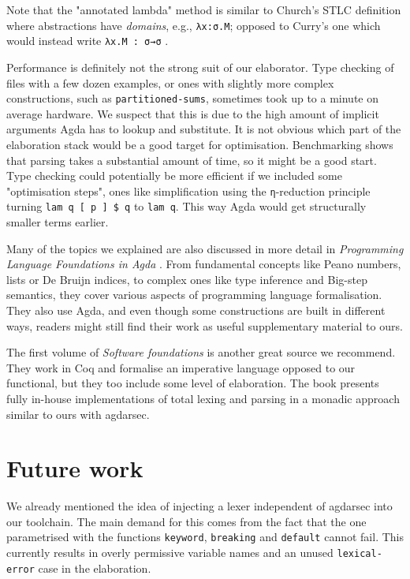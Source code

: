Note that the "annotated lambda" method is similar to Church's STLC definition where abstractions have \textit{domains}, e.g., \verb$λx:σ.M$; opposed to Curry's one which would instead write \verb$λx.M : σ→σ$ \cite{sorensen1998curry}.

Performance is definitely not the strong suit of our elaborator. Type checking of files with a few dozen examples, or ones with slightly more complex constructions, such as \verb$partitioned-sums$, sometimes took up to a minute on average hardware. We suspect that this is due to the high amount of implicit arguments Agda has to lookup and substitute. It is not obvious which part of the elaboration stack would be a good target for optimisation. Benchmarking shows that parsing takes a substantial amount of time, so it might be a good start. Type checking could potentially be more efficient if we included some "optimisation steps", ones like simplification using the \verb$η$-reduction principle turning \verb$lam q [ p ] $\verb$$\verb=$=\verb$$\verb$ q$ to \verb$lam q$. This way Agda would get structurally smaller terms earlier.

Many of the topics we explained are also discussed in more detail in \textit{Programming Language Foundations in Agda} \cite{plfa22.08}. From fundamental concepts like Peano numbers, lists or De Bruijn indices, to complex ones like type inference and Big-step semantics, they cover various aspects of programming language formalisation. They also use Agda, and even though some constructions are built in different ways, readers might still find their work as useful supplementary material to ours.

The first volume of \textit{Software foundations} \cite{Pierce:SF1} is another great source we recommend. They work in Coq and formalise an imperative language opposed to our functional, but they too include some level of elaboration. The book presents fully in-house implementations of total lexing and parsing in a monadic approach similar to ours with agdarsec.

\section{Future work}

We already mentioned the idea of injecting a lexer independent of agdarsec into our toolchain. The main demand for this comes from the fact that the one parametrised with the functions \verb$keyword$, \verb$breaking$ and \verb$default$ cannot fail. This currently results in overly permissive variable names and an unused \verb$lexical-error$ case in the elaboration.

